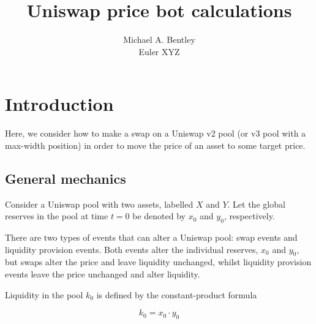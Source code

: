 \documentclass[a4paper, 11pt]{article}
\begin{document}
%
%

\newpage



\title{Uniswap price bot calculations}
\author{Michael A. Bentley \\ Euler XYZ}
\maketitle

\section{Introduction}

Here, we consider how to make a swap on a Uniswap v2 pool (or v3 pool with a max-width position) in order to move the price of an asset to some target price. 

\subsection{General mechanics}

Consider a Uniswap pool with two assets, labelled $X$ and $Y$. Let the global reserves in the pool at time $t = 0$ be denoted by $x_0$ and $y_0$, respectively. 

There are two types of events that can alter a Uniswap pool: swap events and liquidity provision events. Both events alter the individual reserves, $x_0$ and $y_0$, but swaps alter the price and leave liquidity unchanged, whilst liquidity provision events leave the price unchanged and alter liquidity. 

Liquidity in the pool $k_0$ is defined by the constant-product formula

\begin{equation}
\label{eq:k_0}
k_0 = x_0 \cdot y_0
\end{equation}
\end{document}
